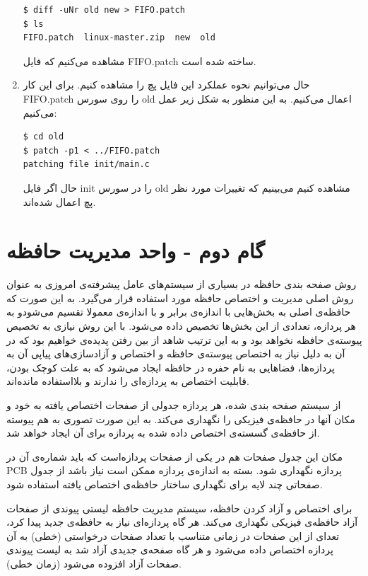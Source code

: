 \documentclass{article}
\begin{document}
\begin{enumerate}
\begin{latin}
\begin{verbatim}
$ diff -uNr old new > FIFO.patch
$ ls
FIFO.patch  linux-master.zip  new  old
\end{verbatim}
\end{latin}
مشاهده می‌کنیم که فایل FIFO.patch ساخته شده است.

\item حال می‌توانیم نحوه عملکرد این فایل پچ را مشاهده کنیم. برای این کار FIFO.patch را روی سورس old اعمال می‌کنیم. به این منظور به شکل زیر عمل می‌کنیم:

\begin{latin}
\begin{verbatim}
$ cd old
$ patch -p1 < ../FIFO.patch
patching file init/main.c
\end{verbatim}
\end{latin}
حال اگر فایل init را در سورس old مشاهده کنیم می‌بینیم که تغییرات مورد نظر پچ اعمال شده‌اند.

\end{enumerate}

\section{گام دوم - واحد مدیریت حافظه}
روش صفحه بندی حافظه در بسیاری از سیستم‌های عامل پیشرفته‌ی امروزی به عنوان روش اصلی مدیریت و اختصاص حافظه مورد استفاده قرار می‌گیرد. به این صورت که حافظه‌ی اصلی به بخش‌هایی با اندازه‌ی برابر و با اندازه‌ی معمولا  تقسیم می‌شودو به هر پردازه، تعدادی از این بخش‌ها تخصیص داده می‌شود. با این روش نیازی به تخصیص پیوسته‌ی حافظه نخواهد بود و به این ترتیب شاهد  از  بین رفتن پدیده‌ی  خواهیم بود که در آن به دلیل نیاز به اختصاص پیوسته‌ی حافظه و اختصاص  و آزاد‌سازی‌های پیاپی آن به پردازه‌ها، فضاهایی به نام حفره
در حافظه ایجاد می‌شود که به علت کوچک بودن، قابلیت اختصاص به پردازه‌ای را ندارند و بلااستفاده مانده‌اند.

از سیستم صفحه بندی شده، هر پردازه جدولی از صفحات اختصاص یافته به خود و مکان آنها در حافظه‌ی فیزیکی را نگهداری می‌کند. به این صورت تصوری به هم پیوسته از حافظه‌ی گسسته‌ی اختصاص داده شده به پردازه برای آن ایجاد خواهد شد.

مکان این جدول صفحات هم در یکی از صفحات پردازه‌است که باید شماره‌ی آن در PCB پردازه نگهداری شود. بسته به اندازه‌ی پردازه ممکن است نیاز باشد از جدول صفحاتی چند لایه برای نگهداری ساختار حافظه‌ی اختصاص یافته استفاده شود.

برای اختصاص و آزاد کردن حافظه، سیستم مدیریت حافظه لیستی پیوندی از صفحات آزاد حافظه‌ی فیزیکی نگهداری می‌کند. هر گاه پردازه‌ای نیاز به حافظه‌ی جدید پیدا کرد، تعدای از این صفحات در زمانی متناسب با تعداد صفحات درخواستی (خطی) به آن پردازه اختصاص داده می‌شود و هر گاه صفحه‌ی جدیدی آزاد شد به لیست پیوندی صفحات آزاد افزوده می‌شود (زمان خطی).
\end{document}
